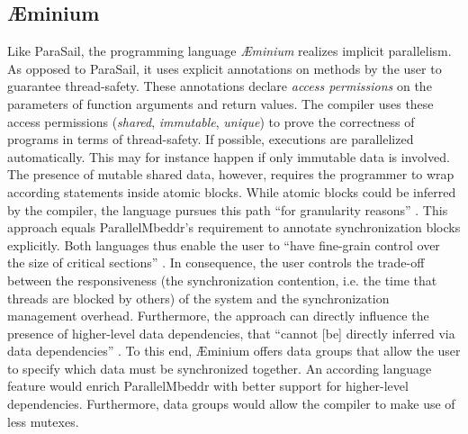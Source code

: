 \subsection{\AE minium}
Like ParaSail, the programming language \textit{\AE minium} realizes implicit parallelism. As opposed to ParaSail, it uses explicit annotations on methods by the user to guarantee thread-safety. These annotations declare \textit{access permissions} \cite{ModularTypestateChecking} on the parameters of function arguments and return values. The compiler uses these access permissions (\textit{shared}, \textit{immutable}, \textit{unique}) to prove the correctness of programs in terms of thread-safety. If possible, executions are parallelized automatically. This may for instance happen if only immutable data is involved. The presence of mutable shared data, however, requires the programmer to wrap according statements inside atomic blocks. While atomic blocks could be inferred by the compiler, the language pursues this path ``for granularity reasons'' \cite{ConcurrencyByDefault}. This approach equals ParallelMbeddr's requirement to annotate synchronization blocks explicitly. Both languages thus enable the user to ``have fine-grain control over the size of critical sections'' \cite{ConcurrencyByDefault}. In consequence, the user controls the trade-off between the responsiveness (the synchronization contention, i.e. the time that threads are blocked by others) of the system and the synchronization management overhead. Furthermore, the approach can directly influence the presence of higher-level data dependencies, that
``cannot [be] directly inferred via data dependencies'' \cite{ConcurrencyByDefault}. To this end, \AE minium offers data groups that allow the user to specify which data must be synchronized together. An according language feature would enrich ParallelMbeddr with better support for higher-level dependencies. Furthermore, data groups would allow the compiler to make use of less mutexes.

